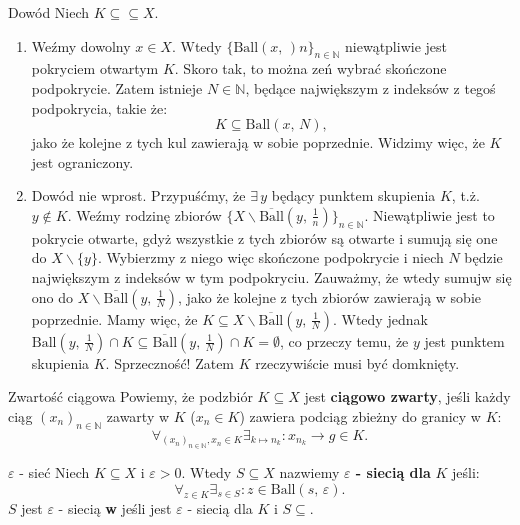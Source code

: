 \documentclass{article}
\numberwithin{defi}{section}
\numberwithin{theo}{section}
\numberwithin{defi}{section}
\newcommand{\N}{\mathbb{N}}
\newcommand{\eps}{\varepsilon}
\newcommand{\ciag}[1]{(#1_{n})_{n \in \N}}
\newcommand{\ball}[2]{\text{Ball}(#1, \, #2)}
\newcommand{\dball}[2]{\overline{\text{Ball}}(#1, \, #2)}
\begin{document}
    \begin{dow}{Dowód}
        Niech $K \subseteq \subseteq X$.
        \begin{enumerate}
            \item Weźmy dowolny $x \in X$. Wtedy $\{ \ball{x}{}n \}_{n \in \N} $ niewątpliwie jest pokryciem otwartym $K$. Skoro tak, to można zeń wybrać skończone podpokrycie. Zatem istnieje $N \in \N$, będące największym z indeksów z tegoś podpokrycia, takie że: \begin{equation*}
                K \subseteq \ball{x}{N},
            \end{equation*} jako że kolejne z tych kul zawierają w sobie poprzednie. Widzimy więc, że $K$ jest ograniczony.

            \item Dowód nie wprost. Przypuśćmy, że $\exists \, y$ będący punktem skupienia $K$, t.ż. $y \notin K$. Weźmy rodzinę zbiorów $\{ X \backslash \dball{y}{\frac{1}{n}} \}_{n \in \N}$. Niewątpliwie jest to pokrycie otwarte, gdyż wszystkie z tych zbiorów są otwarte i sumują się one do $X \backslash \{y\}$. Wybierzmy z niego więc skończone podpokrycie i niech $N$ będzie największym z indeksów w tym podpokryciu. Zauważmy, że wtedy sumujw się ono do $X \backslash \dball{y}{\frac{1}{N}}$, jako że kolejne z tych zbiorów zawierają w sobie poprzednie. Mamy więc, że $K \subseteq X \backslash \dball{y}{\frac{1}{N}}$. Wtedy jednak $ \ball{y}{\frac{1}{N}} \cap K \subseteq \dball{y}{\frac{1}{N}} \cap K = \emptyset$, co przeczy temu, że $y$ jest punktem skupienia $K$. Sprzeczność! Zatem $K$ rzeczywiście musi być domknięty.
        \end{enumerate}
    \end{dow}

    \begin{defr}{Zwartość ciągowa} \label{defr:zwartosc-ciagowa}
        Powiemy, że podzbiór $K \subseteq X$ jest \textbf{ciągowo zwarty}, jeśli każdy ciąg $\ciag{x}$ zawarty w $K$ ($x_n \in K$) zawiera podciąg zbieżny do granicy w $K$: \begin{equation}
            \forall_{\ciag{x}, x_n \in K} \exists_{k \mapsto n_k}: x_{n_k} \to g \in K.
        \end{equation}
    \end{defr}

    \begin{defr}{$\eps$ - sieć} \label{defr:eps-siec}
        Niech $K \subseteq X$ i $\eps > 0$. Wtedy $S \subseteq X$ nazwiemy \textbf{$\eps$ - siecią dla} $K$ jeśli: \begin{equation}
            \forall_{z \in K} \exists_{s \in S}: z \in \ball{s}{\eps}.
        \end{equation} $S$ jest $\eps$ - siecią \textbf{w} jeśli jest $\eps$ - siecią dla $K$ i $S \subseteq$.
    \end{defr}
\end{document}

